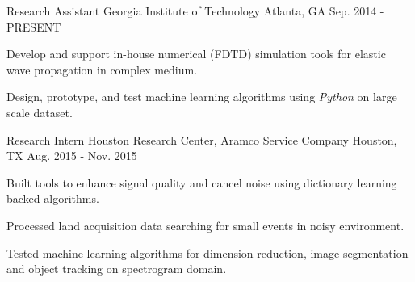 

\begin{cventries}

  \cventry
    {Research Assistant} %
    {Georgia Institute of Technology} %
    {Atlanta, GA} %
    {Sep. 2014 - PRESENT} %
    {
      \begin{cvitems} %
        \item {Develop and support in-house numerical (FDTD) simulation tools for elastic wave propagation in complex medium.}
        \item {Design, prototype, and test machine learning algorithms using \textit{Python} on large scale dataset.}
      \end{cvitems}
    }

  \cventry
    {Research Intern} %
    {Houston Research Center, Aramco Service Company} %
    {Houston, TX} %
    {Aug. 2015 - Nov. 2015} %
    {
      \begin{cvitems} %
        \item {Built tools to enhance signal quality and cancel noise using dictionary learning backed algorithms.}
        \item {Processed land acquisition data searching for small events in noisy environment.}
        \item {Tested machine learning algorithms for dimension reduction, image segmentation and object tracking on spectrogram domain.}
      \end{cvitems}
    }


\end{cventries}
